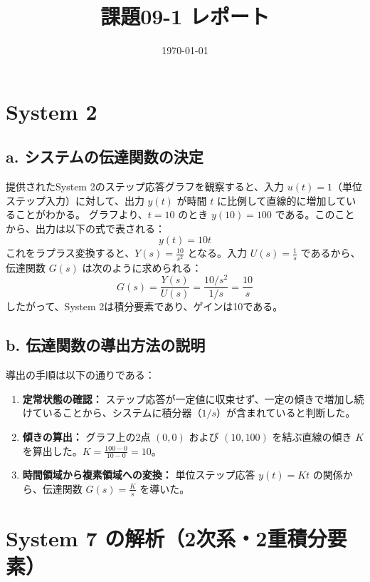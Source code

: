 \documentclass[a4paper,11pt]{jsarticle}
\title{課題09-1 レポート}
\date{\today}
\begin{document}
\maketitle

\section{System 2}

\subsection{a. システムの伝達関数の決定}
提供されたSystem 2のステップ応答グラフを観察すると、入力 $u(t) = 1$（単位ステップ入力）に対して、出力 $y(t)$ が時間 $t$ に比例して直線的に増加していることがわかる。
グラフより、$t = 10$ のとき $y(10) = 100$ である。このことから、出力は以下の式で表される：
\begin{equation}
    y(t) = 10t
\end{equation}
これをラプラス変換すると、$Y(s) = \frac{10}{s^2}$ となる。入力 $U(s) = \frac{1}{s}$ であるから、伝達関数 $G(s)$ は次のように求められる：
\begin{equation}
    G(s) = \frac{Y(s)}{U(s)} = \frac{10/s^2}{1/s} = \frac{10}{s}
\end{equation}
したがって、System 2は積分要素であり、ゲインは10である。

\subsection{b. 伝達関数の導出方法の説明}
導出の手順は以下の通りである：
\begin{enumerate}
    \item \textbf{定常状態の確認：} ステップ応答が一定値に収束せず、一定の傾きで増加し続けていることから、システムに積分器（$1/s$）が含まれていると判断した。
    \item \textbf{傾きの算出：} グラフ上の2点 $(0, 0)$ および $(10, 100)$ を結ぶ直線の傾き $K$ を算出した。$K = \frac{100 - 0}{10 - 0} = 10$。
    \item \textbf{時間領域から複素領域への変換：} 単位ステップ応答 $y(t) = Kt$ の関係から、伝達関数 $G(s) = \frac{K}{s}$ を導いた。
\end{enumerate}

\newpage

\section{System 7 の解析（2次系・2重積分要素）}
\end{document}
